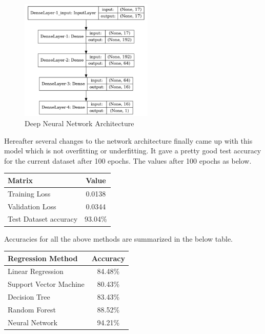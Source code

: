 \begin{figure}[ht]
  \begin{center}
  \includegraphics[width=2.5in]{photo/dnn.png}
  \caption{Deep Neural Network Architecture}\label{deepneuralnetwork}
  \end{center}
\end{figure}

Hereafter several changes to the network architecture finally came up with this model which is not overfitting or underfitting. It gave a pretty good test accuracy for the current dataset after 100 epochs. The values after 100 epochs as below. 

\begin{center}
\begin{tabular}{ |l|c| } 
 \hline
 Matrix & Value  \\ 
 \hline
 Training Loss & 0.0138  \\ 
 Validation Loss & 0.0344  \\ 
 Test Dataset accuracy & 93.04\%  \\ 
 \hline
\end{tabular}
\end{center}

Accuracies for all the above methods are summarized in the below table. 

\begin{center}
\begin{tabular}{ |l|c| } 
 \hline
Regression Method & Accuracy \\ 
 \hline\hline
Linear Regression & 84.48\% \\
Support Vector Machine & 80.43\% \\
Decision Tree & 83.43\% \\
Random Forest & 88.52\% \\
Neural Network & 94.21\% \\
 \hline
\end{tabular}
\end{center}

